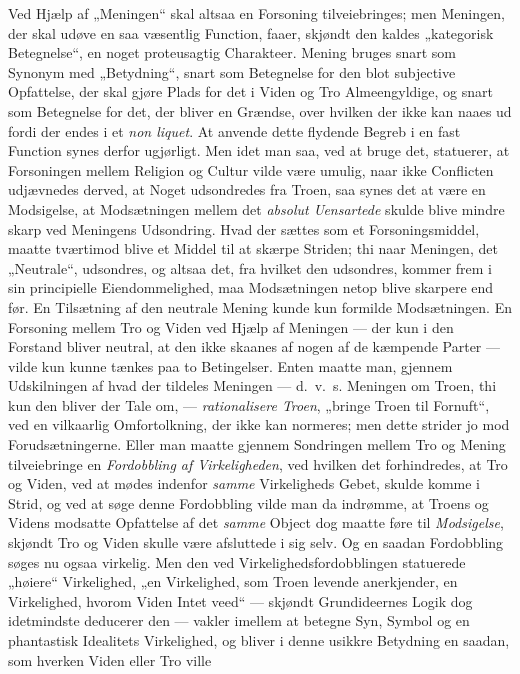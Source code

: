 \documentclass[12pt,a4paper]{book}
\newcommand{\opage}[1]{\marginnote{\footnotesize\textit{[#1]}}}
\begin{document}
Ved Hjælp af „Meningen“ skal altsaa en Forsoning tilveiebringes; men Meningen, der skal udøve
en saa væsentlig Function, faaer, skjøndt den kaldes „kategorisk Betegnelse“, en noget
proteusagtig Charakteer. Mening bruges snart som Synonym med „Betydning“, snart som Betegnelse
for den blot subjective Opfattelse, der skal gjøre Plads for det i Viden og Tro Almeengyldige,
og snart som Betegnelse for det, der bliver en Grændse, over hvilken der ikke kan naaes ud
fordi der endes i et \textit{non liquet}. At \opage{191}anvende dette flydende Begreb i en fast Function
synes derfor ugjørligt. Men idet man saa, ved at bruge det, statuerer, at Forsoningen mellem
Religion og Cultur vilde være umulig, naar ikke Conflicten udjævnedes derved, at Noget
udsondredes fra Troen, saa synes det at være en Modsigelse, at Modsætningen mellem det
\emph{absolut Uensartede} skulde blive mindre skarp ved Meningens Udsondring. Hvad der sættes
som et Forsoningsmiddel, maatte tværtimod blive et Middel til at skærpe Striden; thi naar
Meningen, det „Neutrale“, udsondres, og altsaa det, fra hvilket den udsondres, kommer frem i
sin principielle Eiendommelighed, maa Modsætningen netop blive skarpere end før. En Tilsætning
af den neutrale Mening kunde kun formilde Modsætningen.
En Forsoning mellem Tro og Viden ved Hjælp af Meningen --- der kun i den Forstand bliver
neutral, at den ikke skaanes af nogen af de kæmpende Parter --- vilde kun kunne tænkes paa to
Betingelser. Enten maatte man, gjennem Udskilningen af hvad der tildeles Meningen --- d.\ v.\ s.
Meningen om Troen, thi kun den bliver der Tale om, --- \emph{rationalisere Troen}, „bringe Troen
til Fornuft“, ved en vilkaarlig Omfortolkning, der ikke kan normeres; men dette strider jo mod
Forudsætningerne. Eller man maatte gjennem Sondringen mellem Tro og Mening tilveiebringe en
\emph{Fordobbling af Virkeligheden}, ved hvilken det forhindredes, at Tro og Viden, ved at
mødes indenfor \emph{samme} Virkeligheds Gebet, skulde komme i Strid, og ved at søge denne
Fordobbling vilde man da indrømme, at Troens og Videns modsatte Opfattelse af det \emph{samme}
Object dog maatte føre til \emph{Modsigelse}, skjøndt Tro og Viden skulle være afsluttede i sig selv.
Og en saadan Fordobbling søges nu ogsaa virkelig. Men den ved Virkelighedsfordobblingen
statuerede „høiere“ Virkelighed, „en Virkelighed, som Troen levende anerkjender, en
Virkelighed, hvorom Viden Intet veed“ --- skjøndt Grundideernes Logik dog idetmindste
deducerer den --- vakler imellem at betegne Syn, Symbol og en phantastisk Idealitets
Virkelighed, og bliver i denne usikkre Betydning en saadan, som hverken Viden \opage{192}eller Tro ville
\end{document}
